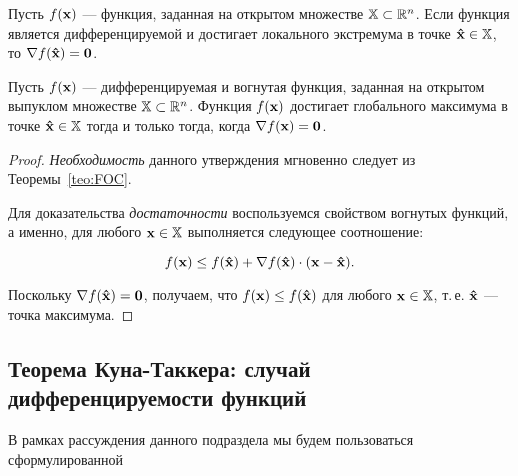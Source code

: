 \begin{teo}\label{teo:FOC}
Пусть $f(\mathbf{x})$ --- функция, заданная на открытом множестве
$\mathbb{X} \subset \mathbb{R}^n$. Если функция является дифференцируемой и
достигает локального экстремума в точке $\mathbf{\hat x} \in \mathbb{X}$, то
$\nabla f(\mathbf{\hat x})=\mathbf{0}$.
\end{teo}


\begin{teo}\label{teo:glob_max_diff_func}
Пусть $f(\mathbf{x})$ --- дифференцируемая и вогнутая функция, заданная
на открытом выпуклом множестве $\mathbb{X} \subset \mathbb{R}^n$. Функция
$f(\mathbf{x})$ достигает глобального максимума в точке $\mathbf{\hat x} \in
\mathbb{X}$ тогда и только тогда, когда $\nabla f(\mathbf{x})=\mathbf{0}$.
\end{teo}

\begin{proof}
\emph{Необходимость} данного утверждения мгновенно следует из
Теоремы~\ref{teo:FOC}.

Для доказательства \emph{достаточности} воспользуемся свойством
вогнутых функций, а именно, для любого $\mathbf{x} \in \mathbb{X}$
выполняется следующее соотношение:

\[
f(\mathbf{x}) \leq f(\mathbf{\hat x}) + \nabla f(\mathbf{\hat x}) \cdot
(\mathbf{x}-\mathbf{\hat x}).
\]

\noindent Поскольку $\nabla f(\mathbf{\hat x})=\mathbf{0}$, получаем, что
$f(\mathbf{x}) \leq f(\mathbf{\hat x})$ для любого $\mathbf{x} \in \mathbb{X}$,
т.\,е. $\mathbf{\hat x}$ --- точка максимума.

\end{proof}


\subsection{Теорема Куна-Таккера: случай дифференцируемости функций}

В рамках рассуждения данного подраздела мы будем пользоваться
сформулированной

